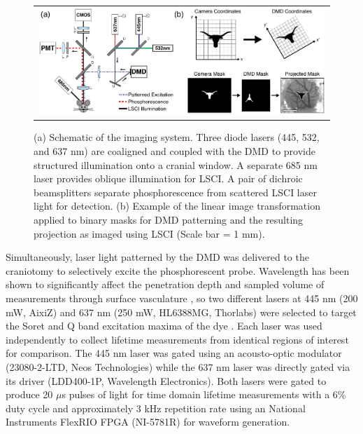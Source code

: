 \documentclass[12pt]{spieman}  %
\begin{document}
\begin{spacing}{2}
\begin{figure}
    \begin{center}
        \begin{tabular}{c}
            \includegraphics[width=6.25in]{Figure1.pdf}
        \end{tabular}
    \end{center}
    \caption {
        \label{fig:system_schematic}
        (a) Schematic of the imaging system. Three diode lasers (445, 532, and 637 nm) are coaligned and coupled with the DMD to provide structured illumination onto a cranial window. A separate 685 nm laser provides oblique illumination for LSCI. A pair of dichroic beamsplitters separate phosphorescence from scattered LSCI laser light for detection. (b) Example of the linear image transformation applied to binary masks for DMD patterning and the resulting projection as imaged using LSCI (Scale bar = 1 mm).
    }
\end{figure}

Simultaneously, laser light patterned by the DMD was delivered to the craniotomy to selectively excite the phosphorescent probe. Wavelength has been shown to significantly affect the penetration depth and sampled volume of measurements through surface vasculature \cite{Davis:2011wj}, so two different lasers at 445 nm (200 mW, AixiZ) and 637 nm (250 mW, HL6388MG, Thorlabs) were selected to target the Soret and Q band excitation maxima of the dye \cite{Esipova:2011hi}. Each laser was used independently to collect lifetime measurements from identical regions of interest for comparison. The 445 nm laser was gated using an acousto-optic modulator (23080-2-LTD, Neos Technologies) while the 637 nm laser was directly gated via its driver (LDD400-1P, Wavelength Electronics). Both lasers were gated to produce 20 $\mu$s pulses of light for time domain lifetime measurements with a 6\% duty cycle and approximately 3 kHz repetition rate using an National Instruments FlexRIO FPGA (NI-5781R) for waveform generation.


\end{spacing}
\end{document}
